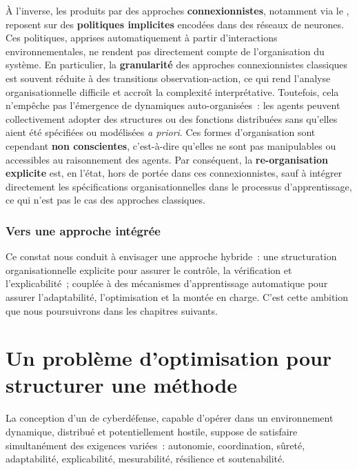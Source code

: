 À l'inverse, les  produits par des approches \textbf{connexionnistes}, notamment via le , reposent sur des \textbf{politiques implicites} encodées dans des réseaux de neurones. Ces politiques, apprises automatiquement à partir d'interactions environnementales, ne rendent pas directement compte de l'organisation du système. En particulier, la \textbf{granularité} des approches connexionnistes classiques est souvent réduite à des transitions observation-action, ce qui rend l'analyse organisationnelle difficile et accroît la complexité interprétative. Toutefois, cela n'empêche pas l'émergence de dynamiques auto-organisées~: les agents peuvent collectivement adopter des structures ou des fonctions distribuées sans qu'elles aient été spécifiées ou modélisées \textit{a priori}. Ces formes d'organisation sont cependant \textbf{non conscientes}, c'est-à-dire qu'elles ne sont pas manipulables ou accessibles au raisonnement des agents. Par conséquent, la \textbf{re-organisation explicite} est, en l'état, hors de portée dans ces  connexionnistes, sauf à intégrer directement les spécifications organisationnelles dans le processus d'apprentissage, ce qui n'est pas le cas des approches  classiques.

\subsection*{Vers une approche intégrée}

Ce constat nous conduit à envisager une approche hybride~: une structuration organisationnelle explicite pour assurer le contrôle, la vérification et l'explicabilité~; couplée à des mécanismes d'apprentissage automatique pour assurer l'adaptabilité, l'optimisation et la montée en charge. C'est cette ambition que nous poursuivrons dans les chapitres suivants.


\clearpage
\thispagestyle{empty}
\null
\newpage

\chapter{Un problème d'optimisation pour structurer une méthode}
\label{chap:hypotheses}

La conception d'un  de cyberdéfense, capable d'opérer dans un environnement dynamique, distribué et potentiellement hostile, suppose de satisfaire simultanément des exigences variées~: autonomie, coordination, sûreté, adaptabilité, explicabilité, mesurabilité, résilience et soutenabilité.

